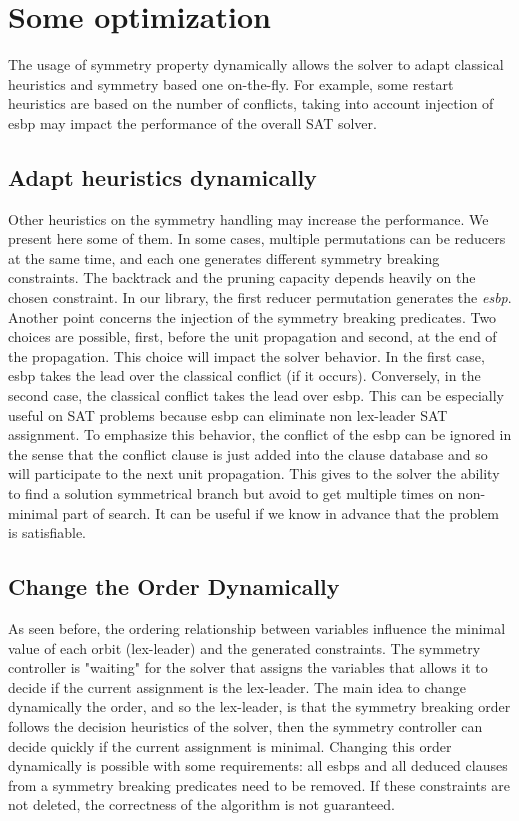 \section{Some optimization}
The usage of symmetry property dynamically allows the solver to adapt classical heuristics and symmetry based one on-the-fly.
For example, some restart heuristics are based on the number of conflicts, taking into account injection of esbp may impact
the performance of the overall SAT solver. 
\subsection{Adapt heuristics dynamically}
Other heuristics on the symmetry handling may increase the performance. We present here some of them.
In some cases, multiple permutations can be reducers at the same time, and each one generates different symmetry breaking constraints.
The backtrack and the pruning capacity depends heavily on the chosen constraint. In our library, the first reducer permutation generates the \textit{esbp}. 
Another point concerns the injection of the symmetry breaking predicates. Two choices are possible, first,
before the unit propagation and second, at the end of the propagation. This choice will impact the solver behavior.
In the first case, esbp takes the lead over the classical conflict (if it occurs). Conversely, in the second case, the classical conflict
takes the lead over esbp. This can be especially useful on SAT problems because esbp can eliminate non lex-leader SAT assignment.
To emphasize this behavior, the conflict of the esbp can be ignored in the sense that the conflict clause is just added into the clause database and so will participate to the next unit propagation. This gives to the solver the ability to find a solution symmetrical branch but avoid to get multiple times on non-minimal part of search. It can be useful if we know in advance that the problem is satisfiable.

\subsection{Change the Order Dynamically}
As seen before, the ordering relationship between variables influence the minimal value of each orbit (lex-leader) and the generated constraints. The symmetry controller is "waiting" for the solver that assigns the variables that allows it to decide if the current assignment is the lex-leader.
The main idea to change dynamically the order, and so the lex-leader, is that the symmetry breaking order follows the decision heuristics of the solver, then the symmetry controller can decide quickly if the current assignment is minimal.
Changing this order dynamically is possible with some requirements: all esbps  and all deduced 
clauses from a symmetry breaking predicates need to be removed. If these constraints are not deleted,
the correctness of the algorithm is not guaranteed.

